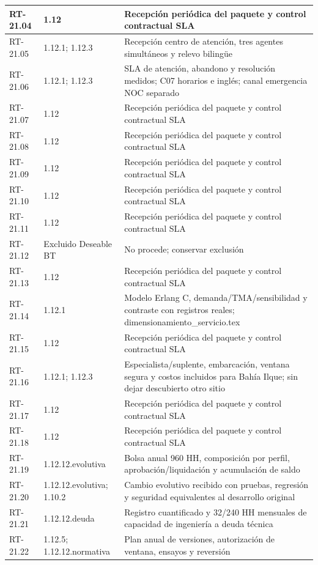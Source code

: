 \begin{longtable}{L{23mm}L{46mm}L{72mm}}
RT-21.04 & 1.12 & Recepción periódica del paquete y control contractual SLA\\\hline
RT-21.05 & 1.12.1; 1.12.3 & Recepción centro de atención, tres agentes simultáneos y relevo bilingüe\\\hline
RT-21.06 & 1.12.1; 1.12.3 & SLA de atención, abandono y resolución medidos; C07 horarios e inglés; canal emergencia NOC separado\\\hline
RT-21.07 & 1.12 & Recepción periódica del paquete y control contractual SLA\\\hline
RT-21.08 & 1.12 & Recepción periódica del paquete y control contractual SLA\\\hline
RT-21.09 & 1.12 & Recepción periódica del paquete y control contractual SLA\\\hline
RT-21.10 & 1.12 & Recepción periódica del paquete y control contractual SLA\\\hline
RT-21.11 & 1.12 & Recepción periódica del paquete y control contractual SLA\\\hline
RT-21.12 & Excluido Deseable BT & No procede; conservar exclusión\\\hline
RT-21.13 & 1.12 & Recepción periódica del paquete y control contractual SLA\\\hline
RT-21.14 & 1.12.1 & Modelo Erlang C, demanda/TMA/sensibilidad y contraste con registros reales; dimensionamiento\_servicio.tex\\\hline
RT-21.15 & 1.12 & Recepción periódica del paquete y control contractual SLA\\\hline
RT-21.16 & 1.12.1; 1.12.3 & Especialista/suplente, embarcación, ventana segura y costos incluidos para Bahía Ilque; sin dejar descubierto otro sitio\\\hline
RT-21.17 & 1.12 & Recepción periódica del paquete y control contractual SLA\\\hline
RT-21.18 & 1.12 & Recepción periódica del paquete y control contractual SLA\\\hline
RT-21.19 & 1.12.12.evolutiva & Bolsa anual 960 HH, composición por perfil, aprobación/liquidación y acumulación de saldo\\\hline
RT-21.20 & 1.12.12.evolutiva; 1.10.2 & Cambio evolutivo recibido con pruebas, regresión y seguridad equivalentes al desarrollo original\\\hline
RT-21.21 & 1.12.12.deuda & Registro cuantificado y 32/240 HH mensuales de capacidad de ingeniería a deuda técnica\\\hline
RT-21.22 & 1.12.5; 1.12.12.normativa & Plan anual de versiones, autorización de ventana, ensayos y reversión\\\hline

\end{longtable}
